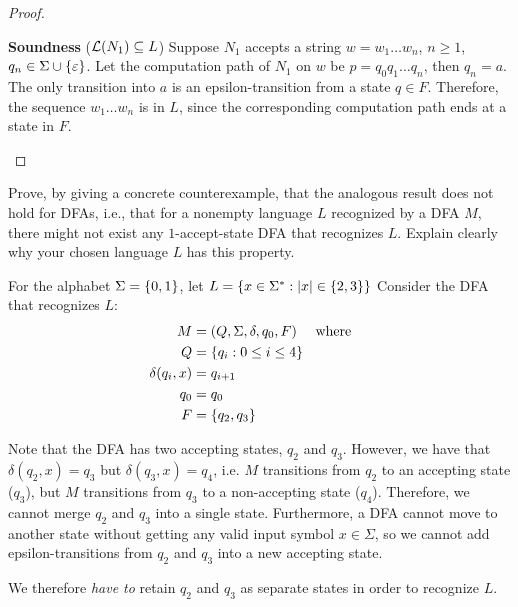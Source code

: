 \begin{problem}
\begin{enumalph}
\begin{Answer}
\begin{claim}
\begin{proof}
\begin{enumroman}
              \item \textbf{Soundness} ($\mathcal{L}(N_1) \subseteq L$)
              Suppose $N_1$ accepts a string $w = w_1\ldots w_n$, $n \ge 1$, $q_n \in \Sigma \cup \left\{\varepsilon\right\}$.
              Let the computation path of $N_1$ on $w$ be $p = q_0q_1\ldots q_n$,
              then $q_n = a$.
              The only transition into $a$ is an epsilon-transition from a state $q \in F$.
              Therefore, the sequence $w_1\ldots w_{n}$ is in $L$,
              since the corresponding computation path ends at a state in $F$.
            \end{enumroman}
          \end{proof}
        \end{claim}
        
      \end{Answer}

    \newpage
    \item Prove, by giving a concrete counterexample,
      that the analogous result does not hold for DFAs,
      i.e., that for a nonempty language $L$ recognized by a DFA $M$,
      there might not exist any $1$-accept-state DFA that recognizes $L$.
      Explain clearly why your chosen language $L$ has this property.
      \begin{Answer}
        For the alphabet $\Sigma = \left\{0, 1\right\}$,
        let $L = \left\{x \in \Sigma^* : \lvert x\rvert \in \left\{2, 3\right\}\right\}$
        Consider the DFA that recognizes $L$:
        \begin{align*}
          M &= (Q, \Sigma, \delta, q_0, F) \quad \text{ where } \quad \\
          Q &= \left\{q_i : 0 \le i \le 4\right\} \\
          \delta(q_i, x) &= q_{i + 1}\\
          q_0 &= q_0 \\
          F &= \left\{q_2, q_3\right\}
        \end{align*}

        \step
        Note that the DFA has two accepting states, $q_2$ and $q_3$.
        However, we have that $\delta(q_2, x) = q_3$ but $\delta(q_3, x) = q_4$,
        i.e. $M$ transitions from $q_2$ to an accepting state ($q_3$),
        but $M$ transitions from $q_3$ to a non-accepting state ($q_4$).
        Therefore, we cannot merge $q_2$ and $q_3$ into a single state.
        Furthermore, a DFA cannot move to another state without getting any
        valid input symbol $x \in \Sigma$, so we cannot add epsilon-transitions
        from $q_2$ and $q_3$ into a new accepting state.

        \step
        We therefore \emph{have to} retain $q_2$ and $q_3$ as separate states
        in order to recognize $L$.
      \end{Answer}
  \end{enumalph}
\end{problem}
